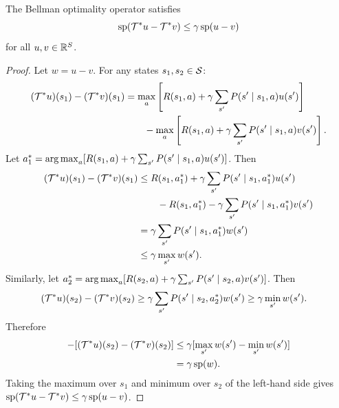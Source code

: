 \documentclass[11pt,a4paper]{article}
\begin{document}
\begin{theorem}
\label{thm:span-contraction}
The Bellman optimality operator satisfies
\[
    \mathrm{sp}(\mathcal{T}^* u - \mathcal{T}^* v)
    \leq \gamma\, \mathrm{sp}(u - v)
\]
for all $u, v \in \mathbb{R}^S$.
\end{theorem}

\begin{proof}
Let $w = u - v$. For any states $s_1, s_2 \in \mathcal{S}$:
\begin{align*}
    (\mathcal{T}^* u)(s_1) - (\mathcal{T}^* v)(s_1)
    &= \max_a \left[R(s_1,a) + \gamma \sum_{s'} P(s' \mid s_1,a)
    u(s')\right] \\
    &\qquad - \max_a \left[R(s_1,a) + \gamma \sum_{s'} P(s' \mid s_1,a)
    v(s')\right].
\end{align*}
Let $a_1^* = \operatorname{arg\,max}_a [R(s_1,a) + \gamma \sum_{s'}
P(s' \mid s_1,a) u(s')]$. Then
\begin{align*}
    (\mathcal{T}^* u)(s_1) - (\mathcal{T}^* v)(s_1)
    &\leq R(s_1, a_1^*) + \gamma \sum_{s'} P(s' \mid s_1, a_1^*)
    u(s') \\
    &\qquad - R(s_1, a_1^*) - \gamma \sum_{s'} P(s' \mid s_1, a_1^*)
    v(s') \\
    &= \gamma \sum_{s'} P(s' \mid s_1, a_1^*) w(s') \\
    &\leq \gamma \max_{s'} w(s').
\end{align*}
Similarly, let $a_2^* = \operatorname{arg\,max}_a [R(s_2,a) + \gamma \sum_{s'}
P(s' \mid s_2,a) v(s')]$. Then
\begin{align*}
    (\mathcal{T}^* u)(s_2) - (\mathcal{T}^* v)(s_2)
    &\geq \gamma \sum_{s'} P(s' \mid s_2, a_2^*) w(s')
    \geq \gamma \min_{s'} w(s').
\end{align*}
Therefore
\begin{align*}
    [(\Bellman^* u)(s_1) - (\Bellman^* v)(s_1)]
    - [(\Bellman^* u)(s_2) - (\Bellman^* v)(s_2)]
    &\leq \discount[\max_{s'} w(s') - \min_{s'} w(s')] \\
    &= \discount\, \mathrm{sp}(w).
\end{align*}
Taking the maximum over $s_1$ and minimum over $s_2$ of the left-hand
side gives $\mathrm{sp}(\mathcal{T}^* u - \mathcal{T}^* v) \leq
\gamma\, \mathrm{sp}(u - v)$.
\end{proof}

\end{document}
